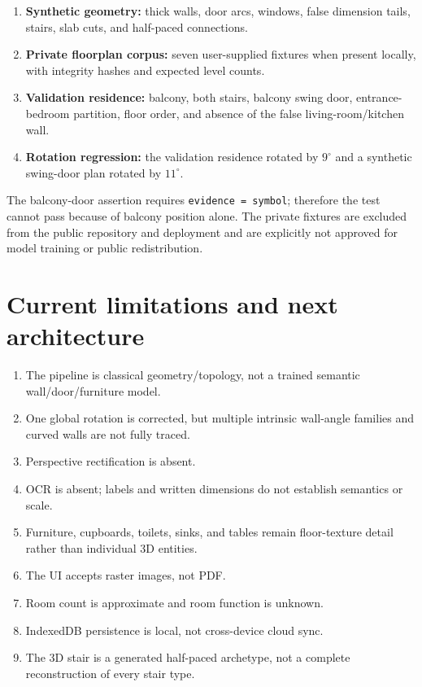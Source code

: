\documentclass[11pt,a4paper]{article}
\newcommand{\code}[1]{\texttt{#1}}
\begin{document}
\begin{enumerate}
  \item \textbf{Synthetic geometry:} thick walls, door arcs, windows, false dimension tails, stairs, slab cuts, and half-paced connections.
  \item \textbf{Private floorplan corpus:} seven user-supplied fixtures when present locally, with integrity hashes and expected level counts.
  \item \textbf{Validation residence:} balcony, both stairs, balcony swing door, entrance-bedroom partition, floor order, and absence of the false living-room/kitchen wall.
  \item \textbf{Rotation regression:} the validation residence rotated by $9^\circ$ and a synthetic swing-door plan rotated by $11^\circ$.
\end{enumerate}

The balcony-door assertion requires \code{evidence = symbol}; therefore the test cannot pass because of balcony position alone. The private fixtures are excluded from the public repository and deployment and are explicitly not approved for model training or public redistribution.

\section{Current limitations and next architecture}

\begin{enumerate}
  \item The pipeline is classical geometry/topology, not a trained semantic wall/door/furniture model.
  \item One global rotation is corrected, but multiple intrinsic wall-angle families and curved walls are not fully traced.
  \item Perspective rectification is absent.
  \item OCR is absent; labels and written dimensions do not establish semantics or scale.
  \item Furniture, cupboards, toilets, sinks, and tables remain floor-texture detail rather than individual 3D entities.
  \item The UI accepts raster images, not PDF.
  \item Room count is approximate and room function is unknown.
  \item IndexedDB persistence is local, not cross-device cloud sync.
  \item The 3D stair is a generated half-paced archetype, not a complete reconstruction of every stair type.
\end{enumerate}
\end{document}
